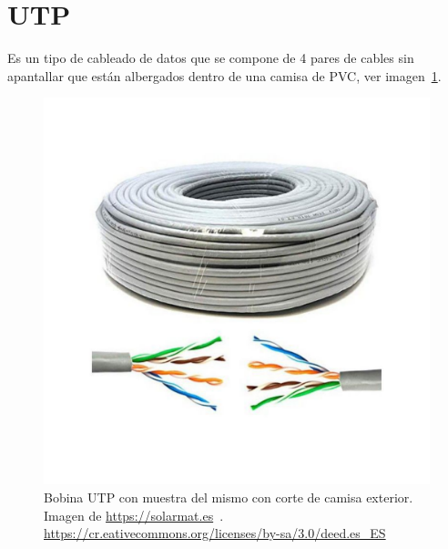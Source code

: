 \section{UTP}\label{concepto:UTP}
Es un tipo de cableado de datos que se compone de 4 pares de cables sin apantallar que están albergados dentro de una camisa de PVC, ver imagen~\ref{Img:Bobina UTP}.

\begin{figure}
    \centering
    \includegraphics[width=.6\textwidth]{img/bobina_UTP.pdf}
    \caption[Bobina UTP]{Bobina UTP con muestra del mismo con corte de camisa exterior. Imagen de \url{https://solarmat.es}~\cite{wiki:Creative}. \url{https://cr.eativecommons.org/licenses/by-sa/3.0/deed.es_ES} } \label{Img:Bobina UTP}
\end{figure}

